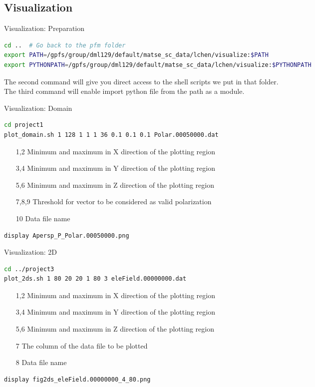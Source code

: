 \documentclass[11pt,aspectratio=169]{beamer}
\begin{document}
\subsection[Visualization]{Visualization}

\begin{frame}[fragile]{Visualization: Preparation }
\begin{lstlisting}[language=bash,basicstyle=\tiny]
cd ..  # Go back to the pfm folder
export PATH=/gpfs/group/dml129/default/matse_sc_data/lchen/visualize:$PATH
export PYTHONPATH=/gpfs/group/dml129/default/matse_sc_data/lchen/visualize:$PYTHONPATH
\end{lstlisting}
The second command will give you direct access to the shell scripts we put in that folder. \\ 
The third command will enable import python file from the path as a module. 
\end{frame}

\begin{frame}[fragile]{Visualization: Domain}
\begin{lstlisting}[language=bash]
cd project1 
plot_domain.sh 1 128 1 1 1 36 0.1 0.1 0.1 Polar.00050000.dat
\end{lstlisting}
\begin{itemize}
    \item[1,2] Minimum and maximum in X direction of the plotting region
    \item[3,4] Minimum and maximum in Y direction of the plotting region
    \item[5,6] Minimum and maximum in Z direction of the plotting region
    \item[7,8,9] Threshold for vector to be considered as valid polarization
    \item[10] Data file name
\end{itemize}
\begin{lstlisting}[language=bash]
display Apersp_P_Polar.00050000.png
\end{lstlisting}
\end{frame}

\begin{frame}[fragile]{Visualization: 2D}
\begin{lstlisting}[language=bash]
cd ../project3  
plot_2ds.sh 1 80 20 20 1 80 3 eleField.00000000.dat
\end{lstlisting}
\begin{itemize}
    \item[1,2] Minimum and maximum in X direction of the plotting region
    \item[3,4] Minimum and maximum in Y direction of the plotting region
    \item[5,6] Minimum and maximum in Z direction of the plotting region
    \item[7] The column of the data file to be plotted
    \item[8] Data file name
\end{itemize}
\begin{lstlisting}[language=bash]
display fig2ds_eleField.00000000_4_80.png
\end{lstlisting}
\end{frame}
\end{document}
